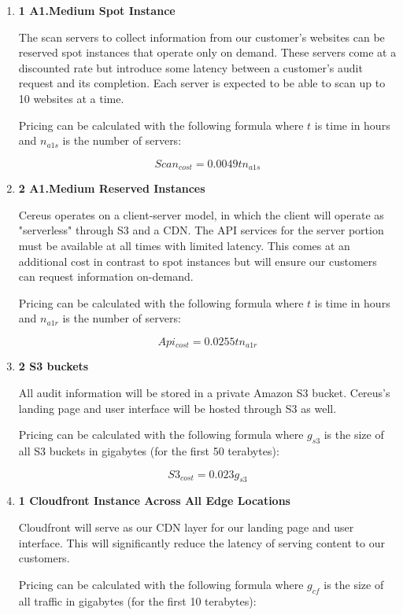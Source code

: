 \begin{enumerate}[\indent {}]

\item \textbf{1 A1.Medium Spot Instance}

The scan servers to collect information from our customer's websites can be reserved spot instances that operate only on demand. These servers come at a discounted rate but introduce some latency between a customer's audit request and its completion. Each server is expected to be able to scan up to 10 websites at a time.

Pricing can be calculated with the following formula where \( t \) is time in hours and \( n_{a1s} \) is the number of servers:

\[ Scan_{cost} = 0.0049tn_{a1s} \]

\item \textbf{2 A1.Medium Reserved Instances}

Cereus operates on a client-server model, in which the client will operate as "serverless" through S3 and a CDN. The API services for the server portion must be available at all times with limited latency. This comes at an additional cost in contrast to spot instances but will ensure our customers can request information on-demand. 

Pricing can be calculated with the following formula where \( t \) is time in hours and \( n_{a1r} \) is the number of servers:

\[ Api_{cost} = 0.0255tn_{a1r} \]

\item \textbf{2 S3 buckets}

All audit information will be stored in a private Amazon S3 bucket. Cereus's landing page and user interface will be hosted through S3 as well.

Pricing can be calculated with the following formula where \( g_{s3} \) is the size of all S3 buckets in gigabytes (for the first 50 terabytes):

\[ S3_{cost} = 0.023g_{s3} \]

\item \textbf{1 Cloudfront Instance Across All Edge Locations}

Cloudfront will serve as our CDN layer for our landing page and user interface. This will significantly reduce the latency of serving content to our customers.

Pricing can be calculated with the following formula where \( g_{cf} \) is the size of all traffic in gigabytes (for the first 10 terabytes):


\end{enumerate}
